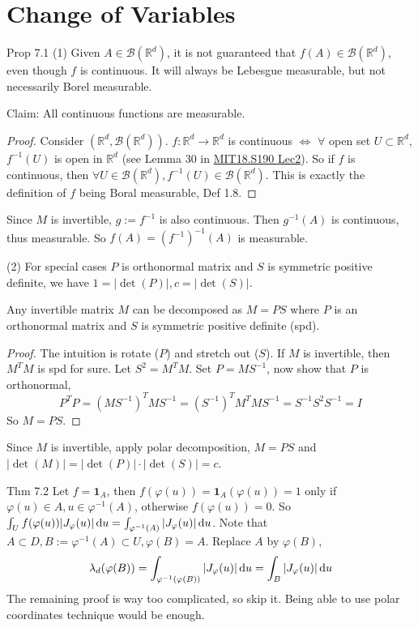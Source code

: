 \setcounter{section}{6}
\section{Change of Variables}

\begin{note}{Prop 7.1}
    (1) Given $A\in\mathcal{B}(\mathbb{R}^d)$, it is not guaranteed that $f(A)\in\mathcal{B}(\mathbb{R}^d)$, even though $f$ is continuous. It will always be Lebesgue measurable, but not necessarily Borel measurable. 

    Claim: All continuous functions are measurable.
    \begin{proof}
        Consider $(\mathbb{R}^d,\mathcal{B}(\mathbb{R}^d))$. $f:\mathbb{R}^d\to \mathbb{R}^d$ is continuous $\iff$ $\forall$ open set $U\subset \mathbb{R}^d$, $f^{-1}(U)$ is open in $\mathbb{R}^d$ (see Lemma 30 in \href{https://ocw.mit.edu/courses/18-s190-introduction-to-metric-spaces-january-iap-2023/mit18_s190iap23_lec2.pdf}{MIT18.S190 Lec2}). So if $f$ is continuous, then $\forall U\in \mathcal{B}(\mathbb{R}^d), f^{-1}(U)\in \mathcal{B}(\mathbb{R}^d)$. This is exactly the definition of $f$ being Boral measurable, Def 1.8.
    \end{proof}
    Since $M$ is invertible, $g:=f^{-1}$ is also continuous. Then $g^{-1}(A)$ is continuous, thus measurable. So $f(A)=(f^{-1})^{-1}(A)$ is measurable.

    (2) For special cases $P$ is orthonormal matrix and $S$ is symmetric positive definite, we have $1=|\det(P)|,c=|\det(S)|$. 
    \begin{lemma}
        Any invertible matrix $M$ can be decomposed as $M=PS$ where $P$ is an orthonormal matrix and $S$ is symmetric positive definite (spd).
    \end{lemma}
    \begin{proof}
        The intuition is rotate ($P$) and stretch out ($S$). If $M$ is invertible, then $M^TM$ is spd for sure. Let $S^2=M^TM$. Set $P=MS^{-1}$, now show that $P$ is orthonormal,
        \[
        P^TP=(MS^{-1})^TMS^{-1}=(S^{-1})^TM^TMS^{-1}=S^{-1}S^2S^{-1}=I
        \]
        So $M=PS$.
    \end{proof}
    Since $M$ is invertible, apply polar decomposition, $M=PS$ and $|\det(M)|=|\det(P)|\cdot|\det(S)|=c$.
\end{note}

\begin{note}{Thm 7.2}
    Let $f=\mathbf{1}_A$, then $f(\varphi(u))=\mathbf{1}_A(\varphi(u))=1$ only if $\varphi(u)\in A,u\in \varphi^{-1}(A)$, otherwise $f(\varphi(u))=0$. So $\int_U f(\varphi(u))|J_{\varphi}(u)|\mathop{}\!\mathrm{d} u=\int_{\varphi^{-1}(A)}|J_{\varphi}(u)|\mathop{}\!\mathrm{d} u$. Note that $A\subset D, B:=\varphi^{-1}(A)\subset U, \varphi(B)=A$. Replace $A$ by $\varphi(B)$, 
    \[
    \lambda_d(\varphi(B))=\int_{\varphi^{-1}(\varphi(B))}|J_{\varphi}(u)|\mathop{}\!\mathrm{d} u=\int_B|J_{\varphi}(u)|\mathop{}\!\mathrm{d} u
    \]
    The remaining proof is way too complicated, so skip it. Being able to use polar coordinates technique would be enough.
\end{note}

